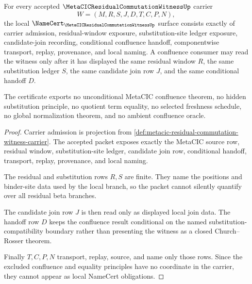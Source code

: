 \begin{theorem}
\label{thm:metacic-residual-commutation-witness-obligations}
For every accepted $\MetaCICResidualCommutationWitnessUp$ carrier
$$
W=(M,R,S,J,D,T,C,P,N),
$$
the local $\NameCert_{\MetaCICResidualCommutationWitnessUp}$ surface consists exactly of carrier admission, residual-window exposure, substitution-site ledger exposure, candidate-join recording, conditional confluence handoff, componentwise transport, replay, provenance, and local naming. A confluence consumer may read the witness only after it has displayed the same residual window $R$, the same substitution ledger $S$, the same candidate join row $J$, and the same conditional handoff $D$.

The certificate exports no unconditional MetaCIC confluence theorem, no hidden substitution principle, no quotient term equality, no selected freshness schedule, no global normalization theorem, and no ambient confluence oracle.
\end{theorem}
\begin{proof}
Carrier admission is projection from \autoref{def:metacic-residual-commutation-witness-carrier}. The accepted packet exposes exactly the MetaCIC source row, residual window, substitution-site ledger, candidate join row, conditional handoff, transport, replay, provenance, and local naming.

The residual and substitution rows $R,S$ are finite. They name the positions and binder-site data used by the local branch, so the packet cannot silently quantify over all residual beta branches.

The candidate join row $J$ is then read only as displayed local join data. The handoff row $D$ keeps the confluence result conditional on the named substitution-compatibility boundary rather than presenting the witness as a closed Church--Rosser theorem.

Finally $T,C,P,N$ transport, replay, source, and name only those rows. Since the excluded confluence and equality principles have no coordinate in the carrier, they cannot appear as local NameCert obligations.
\end{proof}

